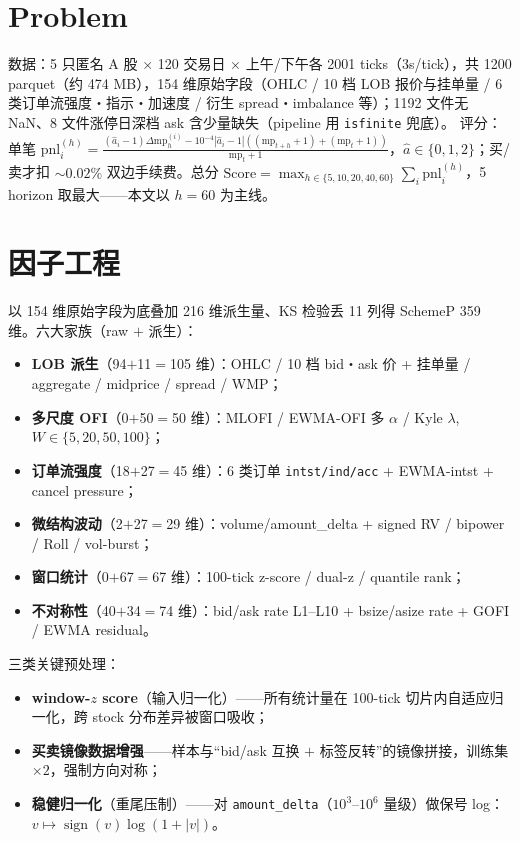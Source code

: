 \documentclass[10pt,twocolumn]{article}
\newcommand{\hl}[1]{\textcolor{lblue}{\textbf{#1}}}
\newcommand{\hlA}[1]{\hl{#1}}
\begin{document}
\section{Problem}

数据：5 只匿名 A 股 $\times$ 120 交易日 $\times$ 上午/下午各 2001 ticks（3s/tick），共 1200 parquet（约 474 MB），154 维原始字段（OHLC / 10 档 LOB 报价与挂单量 / 6 类订单流强度・指示・加速度 / 衍生 spread・imbalance 等）；1192 文件无 NaN、8 文件涨停日深档 ask 含少量缺失（pipeline 用 \texttt{isfinite} 兜底）。
评分：单笔 $\mathrm{pnl}_i^{(h)}=\frac{(\hat a_i-1)\Delta\mathrm{mp}_h^{(i)} - 10^{-4}|\hat a_i-1|((\mathrm{mp}_{t+h}{+}1)+(\mathrm{mp}_t{+}1))}{\mathrm{mp}_t+1}$，$\hat a\in\{0,1,2\}$；买/卖才扣 $\sim 0.02\%$ 双边手续费。总分 $\mathrm{Score}=\max_{h\in\{5,10,20,40,60\}}\sum_i \mathrm{pnl}_i^{(h)}$，5 horizon 取最大——本文以 $h=60$ 为主线。


\section{因子工程}
以 154 维原始字段为底叠加 216 维派生量、KS 检验丢 11 列得 SchemeP 359 维。六大家族（raw $+$ 派生）：
\begin{itemize}
  \setlength{\itemsep}{0pt}
  \item \hlA{LOB 派生}（94$+$11$=$105 维）：OHLC / 10 档 bid・ask 价 + 挂单量 / aggregate / midprice / spread / WMP；
  \item \hlA{多尺度 OFI}（0$+$50$=$50 维）：MLOFI / EWMA-OFI 多 $\alpha$ / Kyle $\lambda$, $W\!\in\!\{5,20,50,100\}$；
  \item \hlA{订单流强度}（18$+$27$=$45 维）：6 类订单 \texttt{intst/ind/acc} + EWMA-intst + cancel pressure；
  \item \hlA{微结构波动}（2$+$27$=$29 维）：volume/amount\_delta + signed RV / bipower / Roll / vol-burst；
  \item \hlA{窗口统计}（0$+$67$=$67 维）：100-tick z-score / dual-z / quantile rank；
  \item \hlA{不对称性}（40$+$34$=$74 维）：bid/ask rate L1--L10 + bsize/asize rate + GOFI / EWMA residual。
\end{itemize}
三类关键预处理：
\begin{itemize}
  \setlength{\itemsep}{0pt}
  \item \hlA{window-$z$ score}（输入归一化）——所有统计量在 100-tick 切片内自适应归一化，跨 stock 分布差异被窗口吸收；
  \item \hlA{买卖镜像数据增强}——样本与``bid/ask 互换 $+$ 标签反转''的镜像拼接，训练集 $\times 2$，强制方向对称；
  \item \hlA{稳健归一化}（重尾压制）——对 \texttt{amount\_delta}（$10^3$--$10^6$ 量级）做保号 log：$v\mapsto\operatorname{sign}(v)\log(1{+}|v|)$。
\end{itemize}
\end{document}
